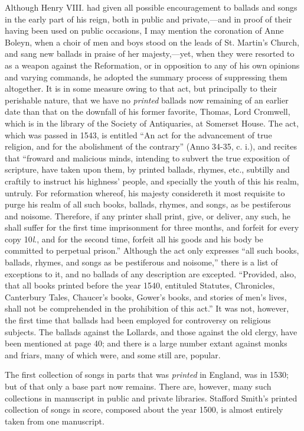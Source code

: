 Although Henry VIII. had given all possible encouragement to ballads and
songs in the early part of his reign, both in public and private,—and in proof
of their having been used on public occasions, I may mention the coronation of
Anne Boleyn, when a choir of men and boys stood on the leads of St. Martin’s
Church, and sang new ballads in praise of her majesty,—yet, when they were resorted
to as a weapon against the Reformation, or in opposition to any of his own
opinions and varying commands, he adopted the summary process of suppressing
them altogether. It is in some measure owing to that act, but principally to their
perishable nature, that we have no \textit{printed} ballads now remaining of an earlier
date than that on the downfall of his former favorite, Thomas, Lord Cromwell,
which is in the library of the Society of Antiquaries, at Somerset House. The
act, which was passed in 1543, is entitled “An act for the advancement of true
religion, and for the abolishment of the contrary” (Anno 34-35, c. i.), and recites
that “froward and malicious minds, intending to subvert the true exposition of
scripture, have taken upon them, by printed ballads, rhymes, etc., subtilly and
craftily to instruct his highness’ people, and specially the youth of this his realm,
untruly. For reformation whereof, his majesty considereth it most requisite to
purge his realm of all such books, ballads, rhymes, and songs, as be pestiferous
and noisome. Therefore, if any printer shall print, give, or deliver, any such, he
shall suffer for the first time imprisonment for three months, and forfeit for every
copy 10\textit{l}., and for the second time, forfeit all his goods and his body be committed
to perpetual prison.” Although the act only expresses “all such books, ballads,
rhymes, and songs as be pestiferous and noisome,” there is a list of exceptions 
to it, and no ballads of any description \pagebreak
 are excepted. “Provided, also, that
all books printed before the year 1540, entituled Statutes, Chronicles, Canterbury
Tales, Chaucer’s books, Gower’s books, and stories of men’s lives, shall not be
comprehended in the prohibition of this act.” It was not, however, the first time
that ballads had been employed for controversy on religious subjects. The ballads
against the Lollards, and those against the old clergy, have been mentioned at
page 40; and there is a large number extant against monks and friars, many of
which were, and some still are, popular.

The first collection of songs in parts that was \textit{printed} in England, was in 1530;
but of that only a base part now remains. There are, however, many such collections
in manuscript in public and private libraries. Stafford Smith’s printed
collection of songs in score, composed about the year 1500, is almost entirely
taken from one manuscript.

